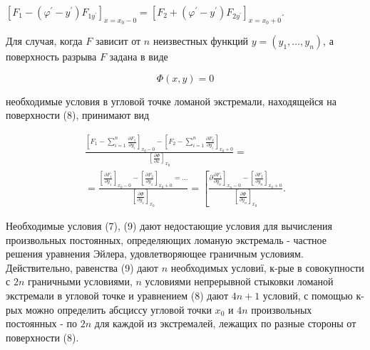\documentclass[10pt]{article}
\begin{document}
$\left[F_{1}-\left(\varphi^{\prime}-y^{\prime}\right) F_{1 y^{\prime}}\right]_{x=x_{0}-0}=\left[F_{2}+\left(\varphi^{\prime}-y^{\prime}\right) F_{2 y^{\prime}}\right]_{x=x_{0}+0}$.



Для случая, когда $F$ зависит от $n$ неизвестных функций $y=\left(y_{1}, \ldots, y_{n}\right)$, а поверхность разрыва $F$ задана в виде



\[

\Phi(x, y)=0

\]



необходимые условия в угловой точке ломаной экстремали, находящейся на поверхности (8), принимают вид



\[

\begin{gathered}

\frac{\left[F_{1}-\sum_{i=1}^{n} \frac{\partial F_{1}}{\partial y_{i}^{\prime}}\right]_{x_{0}-0}-\left[F_{2}-\sum_{i=1}^{n} \frac{\partial F_{2}}{\partial y_{i}^{\prime}}\right]_{x_{0}+0}}{\left[\frac{\partial \Phi}{\partial x}\right]_{x_{0}}}= \\

=\frac{\left[\frac{\partial F_{1}}{\partial y_{1}^{\prime}}\right]_{x_{0}-0}-\left[\frac{\partial F_{2}}{\partial y_{1}^{\prime}}\right]_{x_{0}+0}=\ldots}{\left[\frac{\partial \Phi}{\partial y_{1}}\right]_{x_{0}}}=\left[\frac{\left.\partial \frac{\partial F_{1}}{\partial y_{n}^{\prime}}\right]_{x_{n}-0}-\left[\frac{\partial F_{2}}{\partial y_{n}^{\prime}}\right]_{x_{0}+0}}{\left[\frac{\partial \Phi}{\partial y_{n}}\right]_{x_{0}}} .\right.

\end{gathered}

\]



Необходимые условия (7), (9) дают недостающие условия для вычисления произвольных постоянных, определяющих ломаную экстремаль - частное решения уравнения Эйлера, удовлетворяющее граничным условиям. Действительно, равенства (9) дают $n$ необходимых условиї, к-рые в совокупности с $2 n$ граничными условиями, $n$ условиями непрерывной стыковки ломаной экстремали в угловой точке и уравнением (8) дают $4 n+1$ условий, с помощью к-рых можно определить абсциссу угловой точки $x_{0}$ и $4 n$ произвольных постоянных - по $2 n$ для каждой из экстремалей, лежащих по разные стороны от поверхности (8).
\end{document}
